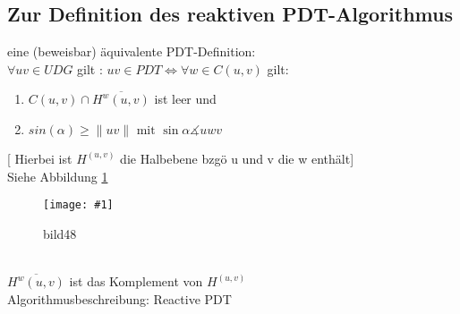 \documentclass{article}
\newcommand{\bild}[4]{ %
	\begin{figure}[h!]
		\centering
		\texttt{[image: \#1]}
		\caption{#3}
		\label{#4}
	\end{figure}	
}
\newcommand{\sieheBild}[4]{
	Siehe Abbildung \ref{#4}
	\bild{#1}{#2}{#3}{#4}
}
\newcommand{\doubleAbs}[1]{
	\|#1\|
}
\begin{document}
\subsection{Zur Definition des reaktiven PDT-Algorithmus}
eine (beweisbar) äquivalente PDT-Definition: \\
$\forall uv \in UDG$ gilt : $uv \in PDT \Leftrightarrow \forall w \in C(u,v)$ gilt:
\begin{enumerate}
	\item $C(u,v) \cap \overline{H^w(u,v)}$ ist leer und
	\item $sin(\alpha) \geq \doubleAbs{uv} \text{ mit } \sin \alpha  \measuredangle uwv$
\end{enumerate}
[ Hierbei ist $H^(u,v)$ die Halbebene bzgö u und v die w enthält]\\
\sieheBild{Bilder/48.png}{0.4}{bild48}{Bild 48}
\\
$\overline{H^w(u,v)}$ ist das Komplement von $H^(u,v)$
\\
Algorithmusbeschreibung: Reactive PDT
\end{document}
